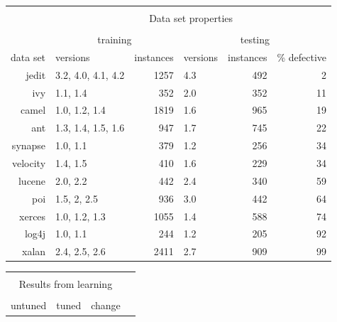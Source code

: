 \begin{figure*}[!t]
\scriptsize
   \begin{center}
   \begin{minipage}{.45\linewidth}
    \begin{tabular}{r@{~}|l@{~}|r@{~}|l@{~}|r@{~}|r@{~}|} \cline{2-6}
   & \multicolumn{5}{c|}{ }\\ 
   
   & \multicolumn{5}{c|}{ Data set  properties}\\ 
   & \multicolumn{5}{c|}{  }\\ 
           & \multicolumn{2}{c|}{training}   & \multicolumn{3}{c|}{testing}      \\ \cline{2-6}
   data set      & versions           & instances & versions     & instances    & \% defective             \\ \hline
        jedit    & 3.2, 4.0, 4.1, 4.2 & 1257      & 4.3          & 492          & 2 \\
        ivy      & 1.1, 1.4           & 352       & 2.0          & 352          & 11 \\
        camel    & 1.0, 1.2, 1.4      & 1819      & 1.6          & 965          & 19 \\
        ant      & 1.3, 1.4, 1.5, 1.6 & 947       & 1.7          & 745          & 22 \\
        synapse  & 1.0, 1.1           & 379       & 1.2          & 256          & 34 \\
        velocity & 1.4, 1.5           & 410       & 1.6          & 229          & 34 \\
        lucene   & 2.0, 2.2           & 442       & 2.4          & 340          & 59 \\
        poi      & 1.5, 2, 2.5        & 936       & 3.0          & 442          & 64 \\
        xerces   & 1.0, 1.2, 1.3      & 1055      & 1.4          & 588          & 74  \\ 
        log4j    & 1.0, 1.1           & 244       & 1.2          & 205          & 92   \\
        xalan    & 2.4, 2.5, 2.6      & 2411      & 2.7          & 909          & 99  \\\hline 
        
        
    \end{tabular}\end{minipage}\begin{minipage}{.4\linewidth}
    \begin{tabular}{rrr|rrr|rr|l} \cline{1-8}
      \multicolumn{8}{c|}{  }\\
      \multicolumn{8}{c|}{  Results from learning}\\
       \multicolumn{8}{c|}{   }\\
   \multicolumn{3}{c|}{untuned} & \multicolumn{3}{c|}{tuned} & \multicolumn{2}{c|}{change}\\
  \cline{1-8}
  

\end{tabular}
\end{minipage}
\end{center}
\end{figure*}
